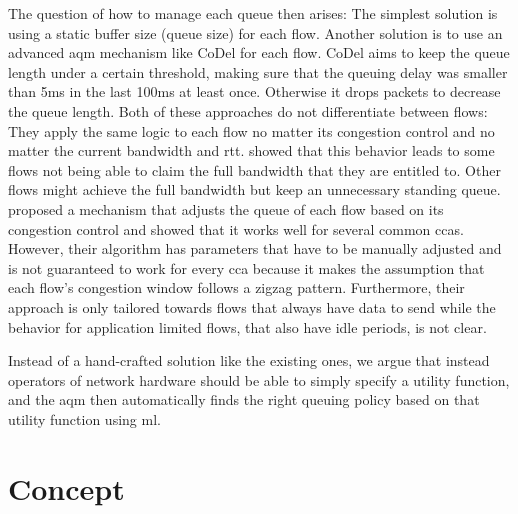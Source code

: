 \documentclass[10pt,sigconf,letterpaper,anonymous]{acmart}
\begin{document}
The question of how to manage each queue then arises: The simplest solution is using a static buffer size (queue size) for each flow. Another solution is to use an advanced \gls{aqm} mechanism like CoDel for each flow. CoDel aims to keep the queue length under a certain threshold, making sure that the queuing delay was smaller than 5\;ms in the last 100\;ms at least once. Otherwise it drops packets to decrease the queue length. Both of these approaches do not differentiate between flows: They apply the same logic to each flow no matter its congestion control and no matter the current bandwidth and \gls{rtt}. \cite{bachl_cocoa_2019} showed that this behavior leads to some flows not being able to claim the full bandwidth that they are entitled to. Other flows might achieve the full bandwidth but keep an unnecessary standing queue. \cite{bachl_rax_2019} proposed a mechanism that adjusts the queue of each flow based on its congestion control and showed that it works well for several common \glspl{cca}. However, their algorithm has parameters that have to be manually adjusted and is not guaranteed to work for every \gls{cca} because it makes the assumption that each flow's congestion window follows a zigzag pattern. Furthermore, their approach is only tailored towards flows that always have data to send while the behavior for application limited flows, that also have idle periods, is not clear. 

Instead of a hand-crafted solution like the existing ones, we argue that instead operators of network hardware should be able to simply specify a utility function, and the \gls{aqm} then automatically finds the right queuing policy based on that utility function using \gls{ml}. 

\section{Concept}
\end{document}
